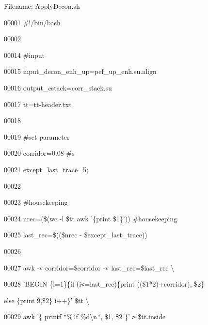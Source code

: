 \documentclass{article}
\begin{document}
\vspace{4pt}
Filename: ApplyDecon.sh

\vspace{16pt}
00001 \#!/bin/bash

\vspace{4pt}
00002 

\vspace{4pt}
00014 \#input

\vspace{4pt}
00015 input\_decon\_enh\_up=pef\_up\_enh.su.align

\vspace{4pt}
00016 output\_cstack=corr\_stack.su

\vspace{4pt}
00017 tt=tt-header.txt

\vspace{4pt}
00018 

\vspace{4pt}
00019 \#set parameter

\vspace{4pt}
00020 corridor=0.08 \#s

\vspace{4pt}
00021 except\_last\_trace=5;

\vspace{4pt}
00022 

\vspace{4pt}
00023 \#housekeeping

\vspace{4pt}
00024 nrec=(\$(wc -l \$tt \textbar{} awk '\{print \$1\}')) \#housekeeping

\vspace{4pt}
00025 last\_rec=\$((\$nrec - \$except\_last\_trace))

\vspace{4pt}
00026 

\vspace{4pt}
00027 awk -v corridor=\$corridor -v last\_rec=\$last\_rec \textbackslash{}

\vspace{4pt}
00028            'BEGIN \{i=1\}\{if (i\texttt{<}=last\_rec)\{print ((\$1*2)+corridor), 
\$2\} 

\vspace{4pt}
else \{print 9,\$2\} i++\}' \$tt \textbackslash{}

\vspace{4pt}
00029            \textbar{} awk '\{ printf \texttt{"}\%4f \%d\textbackslash{}n\texttt{"}, 
\$1, \$2 \}' \texttt{>} \$tt.inside 
\end{document}
